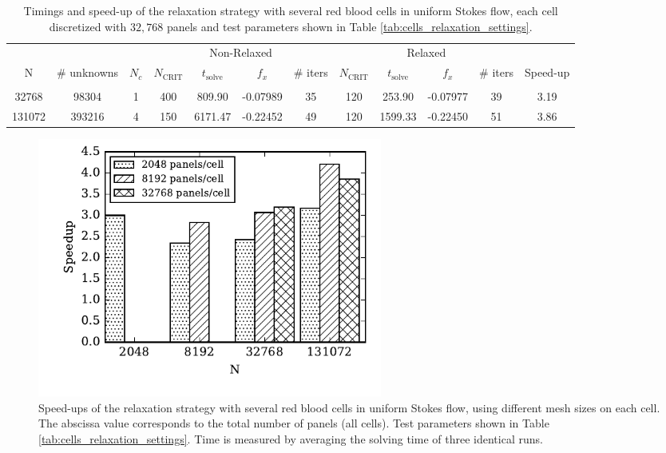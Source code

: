 \documentclass[final,3p,times]{elsarticle}
\newcommand{\ncrit}{N_{\text{CRIT}}}
\newcommand{\tsolve}{t_{\text{solve}}}
\begin{document}
\begin{table}[htp]
\footnotesize
\begin{center}
\begin{tabular}{c|c|c|cccc|cccc|c}
  & & & \multicolumn{4}{c|}{Non-Relaxed} & \multicolumn{4}{c|}{Relaxed} &  \\
  N & \# unknowns & $N_c$ & $\ncrit$ & $\tsolve$ & $f_x$ & \# iters & $\ncrit$ & $\tsolve$ & $f_x$ & \# iters & Speed-up\\
 \hline
   & & & & & & & & & &\\
  32768 & 98304 & 1 & 400 & 809.90 & -0.07989 & 35 & 120 & 253.90 & -0.07977 & 39 & 3.19\\
  131072 & 393216 & 4 & 150 & 6171.47 & -0.22452 & 49 & 120 & 1599.33 & -0.22450 & 51 & 3.86\\
\end{tabular}
\end{center}
\caption{Timings and speed-up of the relaxation strategy with several red blood cells in uniform Stokes flow, each cell discretized with $32,768$ panels and test parameters shown in Table \ref{tab:cells_relaxation_settings}.}
\label{tab:multiple_cell_relaxation_results_32768}
\end{table}


\begin{figure}[ht]
\begin{center}
	\includegraphics[natwidth=4in,natheight=3in,width=0.55\textwidth]{EthrocyteMultipleCellSpeedup.pdf}
	\caption{Speed-ups of the relaxation strategy with several red blood cells in uniform Stokes flow, using different mesh sizes on each cell. The abscissa value corresponds to the total number of panels (all cells). Test parameters shown in Table \ref{tab:cells_relaxation_settings}. Time is measured by averaging the solving time of three identical runs.} 
	\label{fig:multiple_cell_speedup}
\end{center}
\end{figure}
\end{document}
